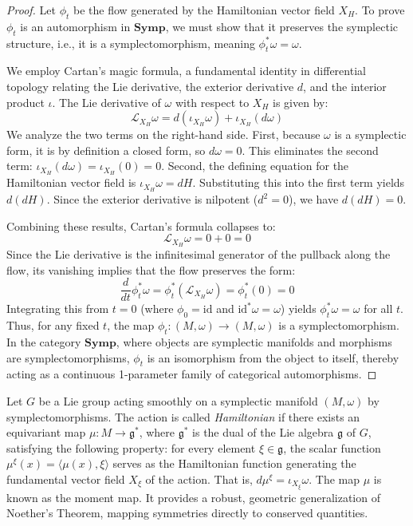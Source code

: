 \begin{proof}
Let $\phi_t$ be the flow generated by the Hamiltonian vector field $X_H$. To prove $\phi_t$ is an automorphism in $\mathbf{Symp}$, we must show that it preserves the symplectic structure, i.e., it is a symplectomorphism, meaning $\phi_t^* \omega = \omega$.

We employ Cartan's magic formula, a fundamental identity in differential topology relating the Lie derivative, the exterior derivative $d$, and the interior product $\iota$. The Lie derivative of $\omega$ with respect to $X_H$ is given by:
\[ \mathcal{L}_{X_H} \omega = d(\iota_{X_H} \omega) + \iota_{X_H} (d\omega) \]
We analyze the two terms on the right-hand side. First, because $\omega$ is a symplectic form, it is by definition a closed form, so $d\omega = 0$. This eliminates the second term: $\iota_{X_H} (d\omega) = \iota_{X_H} (0) = 0$.
Second, the defining equation for the Hamiltonian vector field is $\iota_{X_H} \omega = dH$. Substituting this into the first term yields $d(dH)$. Since the exterior derivative is nilpotent ($d^2 = 0$), we have $d(dH) = 0$.

Combining these results, Cartan's formula collapses to:
\[ \mathcal{L}_{X_H} \omega = 0 + 0 = 0 \]
Since the Lie derivative is the infinitesimal generator of the pullback along the flow, its vanishing implies that the flow preserves the form:
\[ \frac{d}{dt} \phi_t^* \omega = \phi_t^*(\mathcal{L}_{X_H} \omega) = \phi_t^*(0) = 0 \]
Integrating this from $t=0$ (where $\phi_0 = \text{id}$ and $\text{id}^* \omega = \omega$) yields $\phi_t^* \omega = \omega$ for all $t$. Thus, for any fixed $t$, the map $\phi_t: (M, \omega) \to (M, \omega)$ is a symplectomorphism. In the category $\mathbf{Symp}$, where objects are symplectic manifolds and morphisms are symplectomorphisms, $\phi_t$ is an isomorphism from the object to itself, thereby acting as a continuous 1-parameter family of categorical automorphisms.
\end{proof}

\begin{definition}
Let $G$ be a Lie group acting smoothly on a symplectic manifold $(M, \omega)$ by symplectomorphisms. The action is called \emph{Hamiltonian} if there exists an equivariant map $\mu: M \to \mathfrak{g}^*$, where $\mathfrak{g}^*$ is the dual of the Lie algebra $\mathfrak{g}$ of $G$, satisfying the following property: for every element $\xi \in \mathfrak{g}$, the scalar function $\mu^\xi(x) = \langle \mu(x), \xi \rangle$ serves as the Hamiltonian function generating the fundamental vector field $X_\xi$ of the action. That is, $d\mu^\xi = \iota_{X_\xi} \omega$. The map $\mu$ is known as the moment map. It provides a robust, geometric generalization of Noether's Theorem, mapping symmetries directly to conserved quantities.
\end{definition}

